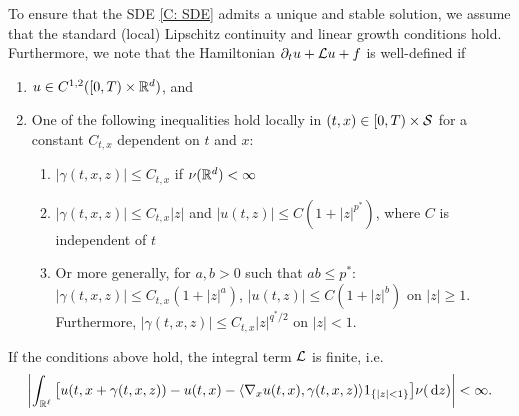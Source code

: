 To ensure that the SDE \eqref{C: SDE} admits a unique and stable solution, we assume that the standard (local) Lipschitz continuity and linear growth conditions hold. Furthermore, we note that the Hamiltonian $\partial_t u + \mathcal{L} u + f$ is well-defined if 
\begin{enumerate}
    \item $u \in C^{1,2}([0,T) \times \mathbb{R}^d)$, and
    \item One of the following inequalities hold locally in $(t,x) \in [0,T) \times \mathcal{S}$ for a constant $C_{t,x}$ dependent on $t$ and $x$:
    \begin{enumerate}[label=(\alph*), ref=(\alph*)]
        \item $|\gamma(t,x,z)| \leq C_{t,x}$ if $\nu(\mathbb{R}^d) < \infty$ \label{C: (a)}
        \item $|\gamma(t,x,z)| \leq C_{t,x}|z|$ and $|u(t,z)| \leq C(1+|z|^{p^*})$, where $C$ is independent of $t$ \label{C: (b)}
        \item Or more generally, for $a,b>0$ such that $ab \leq p^*$: $|\gamma(t,x,z)| \leq C_{t,x}(1+|z|^a)$, $|u(t,z)| \leq C(1+|z|^b)$ on $|z|\geq1$. Furthermore, $|\gamma(t,x,z)| \leq C_{t,x} |z|^{q^*/2}$ on $|z|<1$. \label{C: (c)}
    \end{enumerate}
\end{enumerate}
If the conditions above hold, the integral term $\mathcal{L}$ is finite, i.e.
\begin{equation*}
    \left| \int_{\mathbb{R}^\ell} \big[ u(t,x+\gamma(t,x,z)) - u(t,x) - \langle \nabla_x u(t,x), \gamma(t,x,z) \rangle 1_{\left\{|z|<1\right\}} \big] \nu(\,\mathrm{d} z) \right| < \infty.
\end{equation*}


